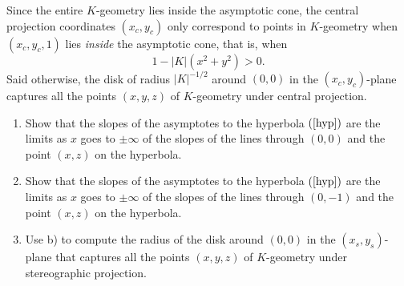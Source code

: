 \documentclass{ximera}
\begin{document}
Since the entire $K$-geometry lies inside the asymptotic cone, the central
projection coordinates $\left(  x_{c},y_{c}\right)  $ only correspond to
points in $K$-geometry when $\left(  x_{c},y_{c},1\right)  $ lies
\textit{inside} the asymptotic cone, that is, when%
\[
1-\left\vert K\right\vert \left(  x^{2}+y^{2}\right)  >0.
\]
Said otherwise, the disk of radius $\left\vert K\right\vert ^{-1/2}$ around
$\left(  0,0\right)  $ in the $\left(  x_{c},y_{c}\right)  $-plane captures
all the points $\left(  x,y,z\right)  $ of $K$-geometry under central projection.

\begin{exercise}\hfil
\begin{enumerate}
\item Show that the slopes of the asymptotes to the hyperbola $\left(
  \ref{hyp}\right) $ are the limits as $x$ goes to $\pm\infty$ of the
  slopes of the lines through $\left( 0,0\right) $ and the point
  $\left( x,z\right) $ on the hyperbola.

\item Show that the slopes of the asymptotes to the hyperbola $\left(
  \ref{hyp}\right) $ are the limits as $x$ goes to $\pm\infty$ of the
  slopes of the lines through $\left( 0,-1\right) $ and the point
  $\left( x,z\right) $ on the hyperbola.

\item Use b) to compute the radius of the disk around $\left(
  0,0\right) $ in the $\left( x_{s},y_{s}\right) $-plane that captures
  all the points $\left( x,y,z\right) $ of $K$-geometry under
  stereographic projection.
\end{enumerate}
\end{exercise}
\end{document}
